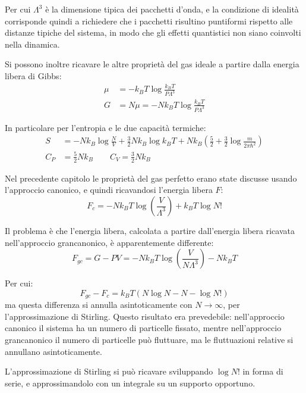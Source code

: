Per cui $\Lambda^3$ è la dimensione tipica dei pacchetti d'onda, e la condizione di idealità corrisponde quindi a richiedere che i pacchetti risultino puntiformi rispetto alle distanze tipiche del sistema, in modo che gli effetti quantistici non siano coinvolti nella dinamica.

Si possono inoltre ricavare le altre proprietà del gas ideale a partire dalla energia libera di Gibbs:
\begin{align*}
	\mu &= - k_B T \log \frac{k_B T}{P \Lambda^3}\\
	G &= N\mu = - N k_B T \log \frac{k_B T}{P \Lambda^3}
\end{align*}

In particolare per l'entropia e le due capacità termiche:
\begin{align*}
	S &= -Nk_B \log \frac{N}{V} + \frac{3}{2} N k_B \log k_B T + N k_B \left(\frac{5}{2} + \frac{3}{2}\log \frac{m}{2\pi \hbar^2}\right)\\
	C_P &= \frac{5}{2} N k_B \qquad C_V = \frac{3}{2} N k_B
\end{align*}

Nel precedente capitolo le proprietà del gas perfetto erano state discusse usando l'approccio canonico, e quindi ricavandosi l'energia libera $F$:
\begin{equation*}
	F_c = - N k_B T \log \left(\frac{V}{\Lambda^3}\right) + k_B T \log N!
\end{equation*}

Il problema è che l'energia libera, calcolata a partire dall'energia libera ricavata nell'approccio grancanonico, è apparentemente differente:
\begin{equation*}
F_{gc} = G - PV = - N k_B T \log \left(\frac{V}{N \Lambda^3}\right) - N k_B T
\end{equation*}

\noindent Per cui:
\begin{equation*}
	F_{gc} - F_c = k_B T (N \log N - N - \log N!)
\end{equation*}
ma questa differenza si annulla asintoticamente con $N \rightarrow \infty$, per l'approssimazione di Stirling. 
Questo risultato era prevedebile: nell'approccio canonico il sistema ha un numero di particelle fissato, mentre nell'approccio grancanonico il numero di particelle può fluttuare, ma le fluttuazioni relative si annullano asintoticamente.

\begin{ex}
	L'approssimazione di Stirling si può ricavare sviluppando $\log N!$ in forma di serie, e approssimandolo con un integrale su un supporto opportuno.
\end{ex}

